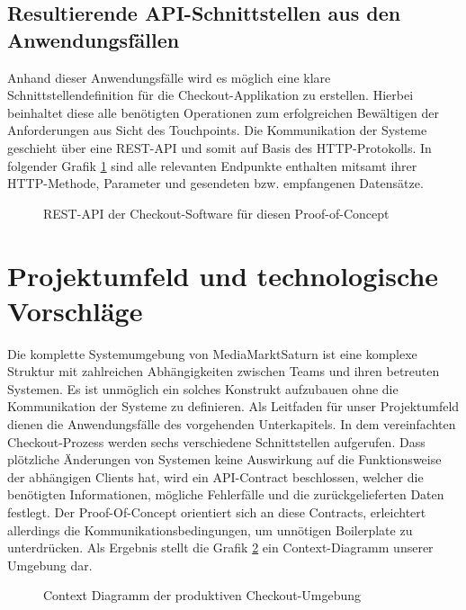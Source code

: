 \subsection{Resultierende API-Schnittstellen aus den Anwendungsfällen}
Anhand dieser Anwendungsfälle wird es möglich eine klare Schnittstellendefinition für die Checkout-Applikation zu erstellen. Hierbei beinhaltet diese alle benötigten Operationen zum erfolgreichen Bewältigen der Anforderungen aus Sicht des Touchpoints. Die Kommunikation der Systeme geschieht über eine REST-API und somit auf Basis des HTTP-Protokolls. In folgender Grafik \ref{fig:REST-API} sind alle relevanten Endpunkte enthalten mitsamt ihrer HTTP-Methode, Parameter und gesendeten bzw. empfangenen Datensätze.

\begin{figure}[htbp]
	\centering
	
	\caption{REST-API der Checkout-Software für diesen Proof-of-Concept}
	\label{fig:REST-API}
\end{figure}

\section{Projektumfeld und technologische Vorschläge}

Die komplette Systemumgebung von MediaMarktSaturn ist eine komplexe Struktur mit zahlreichen Abhängigkeiten zwischen Teams und ihren betreuten Systemen. Es ist unmöglich ein solches Konstrukt aufzubauen ohne die Kommunikation der Systeme zu definieren. Als Leitfaden für unser Projektumfeld dienen die Anwendungsfälle des vorgehenden Unterkapitels. In dem vereinfachten Checkout-Prozess werden sechs verschiedene Schnittstellen aufgerufen. Dass plötzliche Änderungen von Systemen keine Auswirkung auf die Funktionsweise der abhängigen Clients hat, wird ein API-Contract beschlossen, welcher die benötigten Informationen, mögliche Fehlerfälle und die zurückgelieferten Daten festlegt. Der Proof-Of-Concept orientiert sich an diese Contracts, erleichtert allerdings die Kommunikationsbedingungen, um unnötigen Boilerplate zu unterdrücken. Als Ergebnis stellt die Grafik \ref{fig:ContextDiagramm} ein Context-Diagramm unserer Umgebung dar.


\begin{figure}[htbp]
	\centering
	
	\caption{Context Diagramm der produktiven Checkout-Umgebung}
	\label{fig:ContextDiagramm}
\end{figure}

